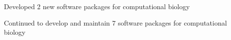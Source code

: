 \begin{tightItemize}
    \item Developed 2 new software packages for computational biology
    \item Continued to develop and maintain 7 software packages for computational biology
\end{tightItemize}
